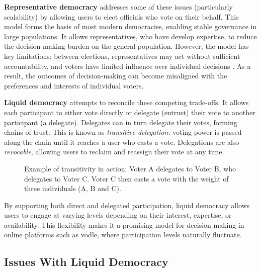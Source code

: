 \textbf{Representative democracy} addresses some of these issues (particularly scalability) by allowing users to elect officials who vote on their behalf. This model forms the basis of most modern democracies, enabling stable governance in large populations. It allows representatives, who have develop expertise, to reduce the decision-making burden on the general population. However, the model has key limitations: between elections, representatives may act without sufficient accountability, and voters have limited influence over individual decisions \citep{blum_liquid_2016}. As a result, the outcomes of decision-making can become misaligned with the preferences and interests of individual voters.

\textbf{Liquid democracy} attempts to reconcile these competing trade-offs. It allows each participant to either vote directly or delegate (entrust) their vote to another participant (a delegate). Delegates can in turn delegate their votes, forming chains of trust. This is known as \textit{transitive delegation}: voting power is passed along the chain until it reaches a user who casts a vote. Delegations are also \textit{revocable}, allowing users to reclaim and reassign their vote at any time.

\begin{figure}[H]
  \centering
  \caption{Example of transitivity in action: Voter A delegates to Voter B, who delegates to Voter C. Voter C then casts a vote with the weight of three individuals (A, B and C).}
  \label{fig:delegation-transitivity}
\end{figure}

By supporting both direct and delegated participation, liquid democracy allows users to engage at varying levels depending on their interest, expertise, or availability. This flexibility makes it a promising model for decision making in online platforms such as vodle, where participation levels naturally fluctuate.

\subsection{Issues With Liquid Democracy}

